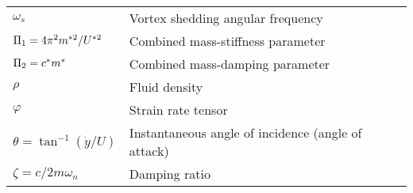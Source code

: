 \begin{longtable}{p{}p{}}
$\omega_s$ & Vortex shedding angular frequency \\
$\Pi_1 =  4\pi^2m^{*2}/U^{*2}$ & Combined mass-stiffness parameter\\
$\Pi_2 = c^*m^*$ & Combined mass-damping parameter\\
$\rho$ & Fluid density  \\
$\varphi$ & Strain rate tensor \\
$\theta= \tan^{-1}{(\dot{y}/U)}$ & Instantaneous angle of incidence (angle of attack)\\
$\zeta= c/2 m \omega_n$ & Damping ratio \\
\end{longtable} 